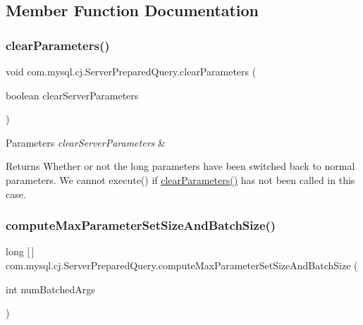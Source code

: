 \subsection{Member Function Documentation}
\mbox{\label{classcom_1_1mysql_1_1cj_1_1_server_prepared_query_aa5d47640d47bde9fff14feaaf1ad2bf1}} 
\subsubsection{\texorpdfstring{clear\+Parameters()}{clearParameters()}}
{\footnotesize\ttfamily void com.\+mysql.\+cj.\+Server\+Prepared\+Query.\+clear\+Parameters (\begin{DoxyParamCaption}\item[{boolean}]{clear\+Server\+Parameters }\end{DoxyParamCaption})}


\begin{DoxyParams}{Parameters}
{\em clear\+Server\+Parameters} & \\
\hline
\end{DoxyParams}
\begin{DoxyReturn}{Returns}
Whether or not the long parameters have been \textquotesingle{}switched\textquotesingle{} back to normal parameters. We cannot execute() if \mbox{\hyperlink{classcom_1_1mysql_1_1cj_1_1_server_prepared_query_aa5d47640d47bde9fff14feaaf1ad2bf1}{clear\+Parameters()}} has not been called in this case. 
\end{DoxyReturn}
\mbox{\label{classcom_1_1mysql_1_1cj_1_1_server_prepared_query_a2b7f3b7ca471b130821b1a3f85f9743e}} 
\subsubsection{\texorpdfstring{compute\+Max\+Parameter\+Set\+Size\+And\+Batch\+Size()}{computeMaxParameterSetSizeAndBatchSize()}}
{\footnotesize\ttfamily long \mbox{[}$\,$\mbox{]} com.\+mysql.\+cj.\+Server\+Prepared\+Query.\+compute\+Max\+Parameter\+Set\+Size\+And\+Batch\+Size (\begin{DoxyParamCaption}\item[{int}]{num\+Batched\+Args }\end{DoxyParamCaption})\hspace{0.3cm}{\ttfamily [protected]}}

